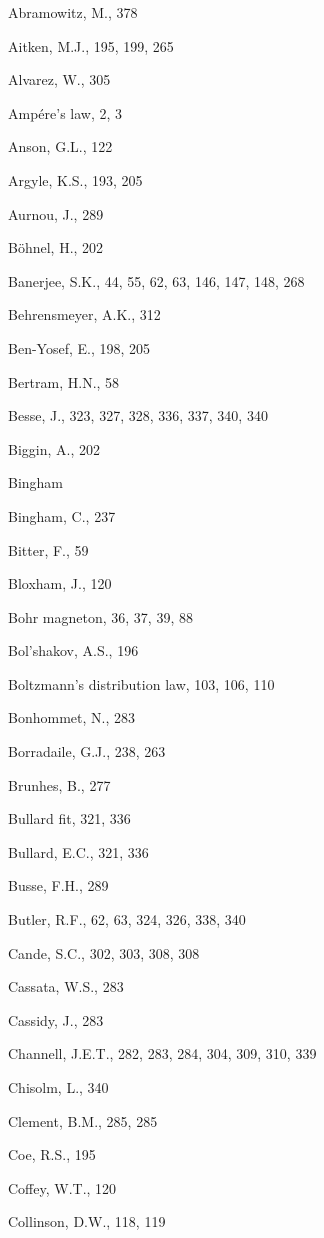 \documentclass[draft,plain]{tauxe}
\begin{document}
\begin{theindex}
\item Abramowitz, M., 378
\item Aitken, M.J., 195, 199, 265
\item Alvarez, W., 305
\item Amp\'{e}re's law, 2, 3
\item Anson, G.L., 122
\item Argyle, K.S., 193, 205
\item Aurnou, J., 289
\item B\"{o}hnel, H., 202
\item Banerjee, S.K., 44, 55, 62, 63, 146, 147, 148, 268
\item Behrensmeyer, A.K., 312
\item Ben-Yosef, E., 198, 205
\item Bertram, H.N., 58
\item Besse, J., 323, 327, 328, 336, 337, 340, 340
\item Biggin, A., 202
\item Bingham
\item Bingham, C., 237
\item Bitter, F., 59
\item Bloxham, J., 120
\item Bohr magneton, 36, 37, 39, 88
\item Bol'shakov, A.S., 196
\item Boltzmann's distribution law, 103, 106, 110
\item Bonhommet, N., 283
\item Borradaile, G.J., 238, 263
\item Brunhes, B., 277
\item Bullard fit, 321, 336
\item Bullard, E.C., 321, 336
\item Busse, F.H., 289
\item Butler, R.F., 62, 63, 324, 326, 338, 340
\item Cande, S.C., 302, 303, 308, 308
\item Cassata, W.S., 283
\item Cassidy, J., 283
\item Channell, J.E.T., 282, 283, 284, 304, 309, 310, 339
\item Chisolm, L., 340
\item Clement, B.M., 285, 285
\item Coe, R.S., 195
\item Coffey, W.T., 120
\item Collinson, D.W., 118, 119

\end{theindex}
\end{document}
